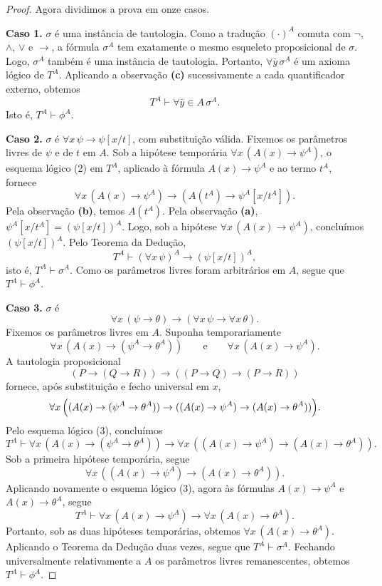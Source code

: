 \begin{proof}
    \smallskip
    Agora dividimos a prova em onze casos.

    \smallskip
    \textbf{Caso 1.} $\sigma$ é uma instância de tautologia.
    Como a tradução $(\cdot)^A$ comuta com $\neg$, $\wedge$, $\vee$ e $\rightarrow$, a fórmula $\sigma^A$ tem exatamente o mesmo esqueleto proposicional de $\sigma$.
    Logo, $\sigma^A$ também é uma instância de tautologia.
    Portanto, $\forall \bar y\,\sigma^A$ é um axioma lógico de $T^A$.
    Aplicando a observação \textbf{(c)} sucessivamente a cada quantificador externo, obtemos
    \[
        T^A\vdash \forall \bar y\in A\,\sigma^A.
    \]
    Isto é, $T^A\vdash \phi^A$.

    \smallskip
    \textbf{Caso 2.} $\sigma$ é $\forall x\,\psi\rightarrow \psi[x/t]$, com substituição válida.
    Fixemos os parâmetros livres de $\psi$ e de $t$ em $A$.
    Sob a hipótese temporária $\forall x\,(A(x)\rightarrow \psi^A)$, o esquema lógico (2) em $T^A$, aplicado à fórmula $A(x)\rightarrow \psi^A$ e ao termo $t^A$, fornece
    \[
        \forall x\,(A(x)\rightarrow \psi^A)\rightarrow (A(t^A)\rightarrow \psi^A[x/t^A]).
    \]
    Pela observação \textbf{(b)}, temos $A(t^A)$.
    Pela observação \textbf{(a)}, $\psi^A[x/t^A] = (\psi[x/t])^A$.
    Logo, sob a hipótese $\forall x\,(A(x)\rightarrow \psi^A)$, concluímos $(\psi[x/t])^A$.
    Pelo Teorema da Dedução,
    \[
        T^A\vdash (\forall x\,\psi)^A \rightarrow (\psi[x/t])^A,
    \]
    isto é, $T^A\vdash \sigma^A$.
    Como os parâmetros livres foram arbitrários em $A$, segue que $T^A\vdash \phi^A$.

    \smallskip
    \textbf{Caso 3.} $\sigma$ é
    \[
        \forall x\,(\psi\rightarrow \theta)\rightarrow (\forall x\,\psi\rightarrow \forall x\,\theta).
    \]
    Fixemos os parâmetros livres em $A$.
    Suponha temporariamente
    \[
        \forall x\,(A(x)\rightarrow (\psi^A\rightarrow \theta^A))
        \qquad\text{e}\qquad
        \forall x\,(A(x)\rightarrow \psi^A).
    \]
    A tautologia proposicional
    \[
        (P\rightarrow (Q\rightarrow R))\rightarrow ((P\rightarrow Q)\rightarrow (P\rightarrow R))
    \]
    fornece, após substituição e fecho universal em $x$,
    \[
        \forall x\,\Bigl((A(x)\rightarrow (\psi^A\rightarrow \theta^A))\rightarrow ((A(x)\rightarrow \psi^A)\rightarrow (A(x)\rightarrow \theta^A))\Bigr).
    \]
    Pelo esquema lógico (3), concluímos
    \[
        T^A\vdash \forall x\,(A(x)\rightarrow (\psi^A\rightarrow \theta^A))
        \rightarrow
        \forall x\,((A(x)\rightarrow \psi^A)\rightarrow (A(x)\rightarrow \theta^A)).
    \]
    Sob a primeira hipótese temporária, segue
    \[
        \forall x\,((A(x)\rightarrow \psi^A)\rightarrow (A(x)\rightarrow \theta^A)).
    \]
    Aplicando novamente o esquema lógico (3), agora às fórmulas $A(x)\rightarrow \psi^A$ e $A(x)\rightarrow \theta^A$, segue
    \[
        T^A\vdash \forall x\,(A(x)\rightarrow \psi^A)\rightarrow \forall x\,(A(x)\rightarrow \theta^A).
    \]
    Portanto, sob as duas hipóteses temporárias, obtemos $\forall x\,(A(x)\rightarrow \theta^A)$.
    Aplicando o Teorema da Dedução duas vezes, segue que $T^A\vdash \sigma^A$.
    Fechando universalmente relativamente a $A$ os parâmetros livres remanescentes, obtemos $T^A\vdash \phi^A$.


\end{proof}
